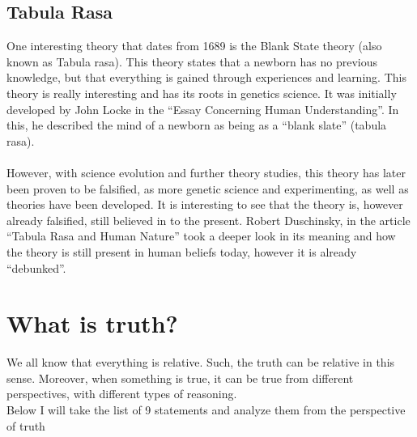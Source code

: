 \documentclass[english]{report}
\begin{document}
\section{Tabula Rasa}
One interesting theory that dates from 1689 is the Blank State theory (also known as Tabula rasa). This theory states that a newborn has no previous knowledge, but that everything is gained through experiences and learning. This theory is really interesting and has its roots in genetics science. It was initially developed by John Locke in the ``Essay Concerning Human Understanding''. In this, he described the mind of a newborn as being as a ``blank slate'' (tabula rasa).
\\\\
However, with science evolution and further theory studies, this theory has later been proven to be falsified, as more genetic science and experimenting, as well as theories have been developed. It is interesting to see that the theory is, however already falsified, still believed in to the present. Robert Duschinsky, in the article ``Tabula Rasa and Human Nature'' \cite{tabula-rasa} took a deeper look in its meaning and how the theory is still present in human beliefs today, however it is already ``debunked''.

\chapter{What is truth?}

We all know that everything is relative. Such, the truth can be relative in this sense. Moreover, when something is true, it can be true from different perspectives, with different types of reasoning.
\\
Below I will take the list of 9 statements and analyze them from the perspective of truth
\end{document}
